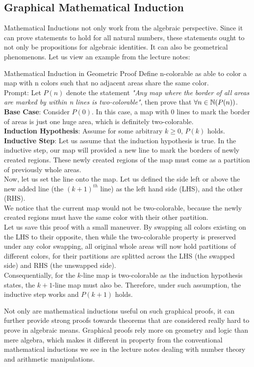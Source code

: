 \subsection{Graphical Mathematical Induction}
Mathematical Inductions not only work from the algebraic perspective. Since it can prove statements to hold for all natural numbers, these statements ought to not only be propositions for algebraic identities. It can also be geometrical phenomenons. Let us view an example from the lecture notes:
\begin{ln-think}{Mathematical Induction in Geometric Proof}{}
    Define n-colorable as able to color a map with n colors such that no adjacent areas share the same color. \\
    Prompt: Let $P(n)$ denote the statement \textit{"Any map where the border of all areas are marked by within n lines is two-colorable"}, then prove that $\forall n \in \mathbb{N} (P(n))$.
    \tcblower
    \textbf{Base Case}: Consider $P(0)$. In this case, a map with $0$ lines to mark the border of areas is just one huge area, which is definitely two-colorable. \\
    \textbf{Induction Hypothesis}: Assume for some arbitrary $k \geq 0$, $P(k)$ holds. \\
    \textbf{Inductive Step}: Let us assume that the induction hypothesis is true. In the inductive step, our map will provided a new line to mark the borders of newly created regions. These newly created regions of the map must come as a partition of previously whole areas. \\
    Now, let us set the line onto the map. Let us defined the side left or above the new added line (the $(k + 1)^{th}$ line) as the left hand side (LHS), and the other (RHS). \\
    We notice that the current map would not be two-colorable, because the newly created regions must have the same color with their other partition. \\
    Let us save this proof with a small maneuver. By swapping all colors existing on the LHS to their opposite, then while the two-colorable property is preserved under any color swapping, all original whole areas will now hold partitions of different colors, for their partitions are splitted across the LHS (the swapped side) and RHS (the unswapped side). \\
    Consequentially, for the $k$-line map is two-colorable as the induction hypothesis states, the $k + 1$-line map must also be. Therefore, under such assumption, the inductive step works and $P(k + 1)$ holds.
\end{ln-think}
Not only are mathematical inductions useful on such graphical proofs, it can further provide strong proofs towards theorems that are considered really hard to prove in algebraic means. Graphical proofs rely more on geometry and logic than mere algebra, which makes it different in property from the conventional mathematical inductions we see in the lecture notes dealing with number theory and arithmetic manipulations.

